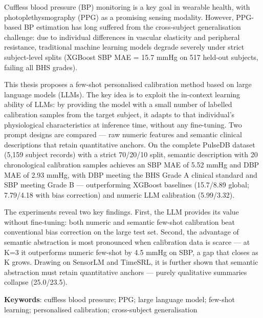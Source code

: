 Cuffless blood pressure (BP) monitoring is a key goal in wearable health, with photoplethysmography (PPG) as a promising sensing modality. However, PPG-based BP estimation has long suffered from the cross-subject generalisation challenge: due to individual differences in vascular elasticity and peripheral resistance, traditional machine learning models degrade severely under strict subject-level splits (XGBoost SBP MAE = 15.7 mmHg on 517 held-out subjects, failing all BHS grades).

This thesis proposes a few-shot personalised calibration method based on large language models (LLMs). The key idea is to exploit the in-context learning ability of LLMs: by providing the model with a small number of labelled calibration samples from the target subject, it adapts to that individual's physiological characteristics at inference time, without any fine-tuning. Two prompt designs are compared --- raw numeric features and semantic clinical descriptions that retain quantitative anchors. On the complete PulseDB dataset (5,159 subject records) with a strict 70/20/10 split, semantic description with 20 chronological calibration samples achieves an SBP MAE of 5.52 mmHg and DBP MAE of 2.93 mmHg, with DBP meeting the BHS Grade A clinical standard and SBP meeting Grade B --- outperforming XGBoost baselines (15.7/8.89 global; 7.79/4.18 with bias correction) and numeric LLM calibration (5.99/3.32).

The experiments reveal two key findings. First, the LLM provides its value without fine-tuning: both numeric and semantic few-shot calibration beat conventional bias correction on the large test set. Second, the advantage of semantic abstraction is most pronounced when calibration data is scarce --- at K=3 it outperforms numeric few-shot by 4.5 mmHg on SBP, a gap that closes as K grows. Drawing on SensorLM and TimeSRL, it is further shown that semantic abstraction must retain quantitative anchors --- purely qualitative summaries collapse (25.0/23.5).

\textbf{Keywords}: cuffless blood pressure; PPG; large language model; few-shot learning; personalised calibration; cross-subject generalisation
